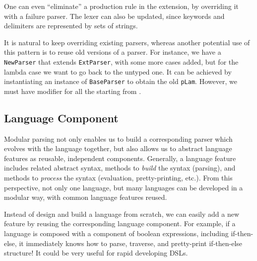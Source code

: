 

One can even ``eliminate'' a production rule in the extension, by overriding it with a failure parser. The lexer can also be updated, since keywords and delimiters are represented by sets of strings.

It is natural to keep overriding existing parsers, whereas another potential use of this pattern is to reuse old versions of a parser. For instance,
we have a \lstinline{NewParser} that extends \lstinline{ExtParser}, with some more cases added, but for the lambda case we want to go back to the untyped one.
It can be achieved by instantiating an instance of \lstinline{BaseParser} to obtain the old \lstinline{pLam}. However, we must have  modifier for all the  starting from .



\subsection{Language Component}\label{subsec:language-component}

Modular parsing not only enables us to build a corresponding parser which evolves with the language together, but also allows us to abstract language features as reusable, independent components. Generally, a language feature includes related abstract syntax, methods to \textit{build} the syntax (parsing), and methods to \textit{process} the syntax (evaluation, pretty-printing, etc.). From this perspective, not only one language, but many languages can be developed in a modular way, with common language features reused.

Instead of design and build a language from scratch, we can easily add a new feature by reusing the corresponding language component. For example, if a language is composed with a component of boolean expressions, including if-then-else, it immediately knows how to parse, traverse, and pretty-print if-then-else structure! It could be very useful for rapid developing DSLs.

